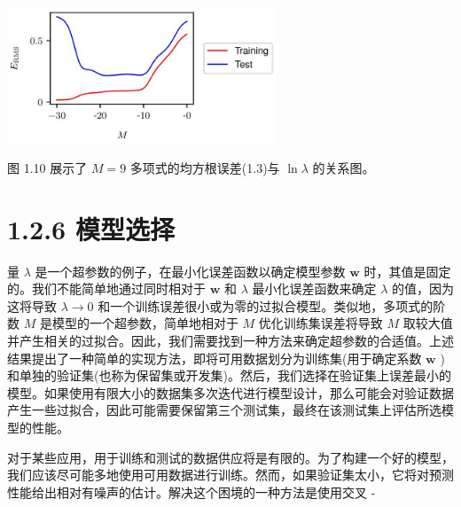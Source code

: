 \documentclass[10pt]{article}
\begin{document}
\begin{center}
\includegraphics[max width=0.6\textwidth]{images/0194e279-9b28-703a-88f4-c3ac21e2010d_33_798_344_753_382_0.jpg}
\end{center}
\hspace*{3em} 

图 1.10 展示了 \(M = 9\) 多项式的均方根误差(1.3)与 \(\ln \lambda\) 的关系图。

\section*{1.2.6 模型选择}

量 \(\lambda\) 是一个超参数的例子，在最小化误差函数以确定模型参数 \(\mathbf{w}\) 时，其值是固定的。我们不能简单地通过同时相对于 \(\mathbf{w}\) 和 \(\lambda\) 最小化误差函数来确定 \(\lambda\) 的值，因为这将导致 \(\lambda  \rightarrow  0\) 和一个训练误差很小或为零的过拟合模型。类似地，多项式的阶数 \(M\) 是模型的一个超参数，简单地相对于 \(M\) 优化训练集误差将导致 \(M\) 取较大值并产生相关的过拟合。因此，我们需要找到一种方法来确定超参数的合适值。上述结果提出了一种简单的实现方法，即将可用数据划分为训练集(用于确定系数 \(\mathbf{w}\) )和单独的验证集(也称为保留集或开发集)。然后，我们选择在验证集上误差最小的模型。如果使用有限大小的数据集多次迭代进行模型设计，那么可能会对验证数据产生一些过拟合，因此可能需要保留第三个测试集，最终在该测试集上评估所选模型的性能。

对于某些应用，用于训练和测试的数据供应将是有限的。为了构建一个好的模型，我们应该尽可能多地使用可用数据进行训练。然而，如果验证集太小，它将对预测性能给出相对有噪声的估计。解决这个困境的一种方法是使用交叉 -
\end{document}
